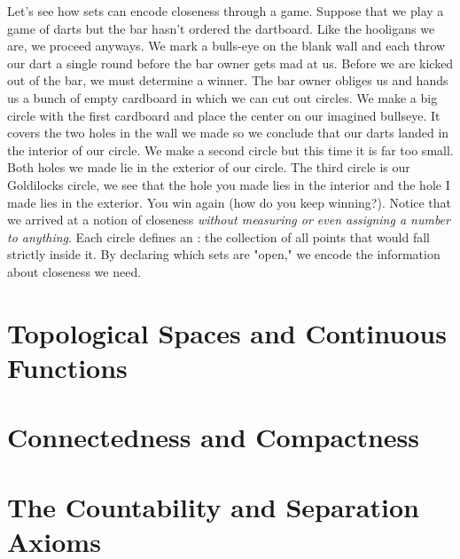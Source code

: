 Let's see how sets can encode closeness through a game. Suppose that we play a game of darts but the bar hasn't ordered the dartboard. Like the hooligans we are, we proceed anyways. We mark a bulls-eye on the blank wall and each throw our dart a single round before the bar owner gets mad at us. Before we are kicked out of the bar, we must determine a winner. The bar owner obliges us and hands us a bunch of empty cardboard in which we can cut out circles. We make a big circle with the first cardboard and place the center on our imagined bullseye. It covers the two holes in the wall we made so we conclude that our darts landed in the interior of our circle. We make a second circle but this time it is far too small. Both holes we made lie in the exterior of our circle. The third circle is our Goldilocks circle, we see that the hole you made lies in the interior and the hole I made lies in the exterior. You win again (how do you keep winning?). Notice that we arrived at a notion of closeness \emph{without measuring or even assigning a number to anything}. Each circle defines an : the collection of all points that would fall strictly inside it. By declaring which sets are "open," we encode the information about closeness we need.

\chapter{Topological Spaces and Continuous Functions}


\chapter{Connectedness and Compactness}


\chapter{The Countability and Separation Axioms}

